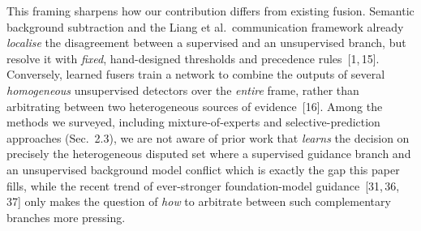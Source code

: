 \documentclass[sn-basic]{sn-jnl}
\begin{document}
This framing sharpens how our contribution differs from existing fusion. Semantic
background subtraction and the Liang et al.\ communication framework already
\emph{localise} the disagreement between a supervised and an unsupervised branch, but
resolve it with \emph{fixed}, hand-designed thresholds and precedence rules~[1,\,15].
Conversely, learned fusers train a network to combine the outputs of several
\emph{homogeneous} unsupervised detectors over the \emph{entire} frame, rather than
arbitrating between two heterogeneous sources of evidence~[16]. Among the methods we
surveyed, including mixture-of-experts and selective-prediction approaches (Sec.~2.3),
we are not aware of prior work that \emph{learns} the decision on precisely the
heterogeneous disputed set where a supervised guidance branch and an unsupervised
background model conflict
which is exactly the gap this paper fills, while the recent trend of ever-stronger
foundation-model guidance~[31,\,36,\,37] only makes the question of \emph{how} to
arbitrate between such complementary branches more pressing.
\end{document}

